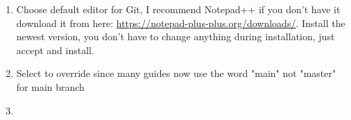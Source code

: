 \documentclass[a4paper,12pt]{book}
\begin{document}
\begin{enumerate}
	\item \begin{minipage}[t]{\linewidth}
		\raggedright
		\medskip	
	\end{minipage}
	Choose default editor for Git, I recommend Notepad++ if you don't have it download it from here: \url{https://notepad-plus-plus.org/downloads/}. Install the newest version, you don't have to change anything during installation, just accept and install.
	\item \begin{minipage}[t]{\linewidth}
		\raggedright
		\medskip	
	\end{minipage}
	Select to override since many guides now use the word "main" not "master" for main branch
	\item \begin{minipage}[t]{\linewidth}

\end{minipage}
\end{enumerate}
\end{document}
